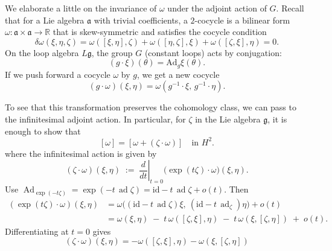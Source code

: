 \documentclass[12pt]{article}
\begin{document}
\begin{remark}
    We elaborate a little on the invariance of $\omega$ under the adjoint action of $G$. Recall that for a Lie algebra $\mathfrak{a}$ with trivial coefficients, a $2$-cocycle is a bilinear form $\omega : \mathfrak{a}\times\mathfrak{a}\to \mathbb{R}$ that is skew-symmetric and satisfies the cocycle condition
    \[
        \delta\omega(\xi,\eta,\zeta) =
        \omega([\xi,\eta],\zeta) + \omega([\eta,\zeta],\xi) + \omega([\zeta,\xi],\eta) = 0.
    \]
    On the loop algebra $L\mathfrak{g}$, the group $G$ (constant loops) acts by conjugation:
    \[
        (g\cdot \xi)(\theta) = \mathrm{Ad}_g \xi(\theta).
    \]
    If we push forward a cocycle $\omega$ by $g$, we get a new cocycle
    \[
        (g\cdot \omega)(\xi,\eta) = \omega(g^{-1}\cdot \xi, \, g^{-1}\cdot \eta).
    \]

    To see that this transformation preserves the cohomology class, we can pass to the infinitesimal adjoint action. In particular, for $\zeta$ in the Lie algebra $\mathfrak{g}$, it is enough to show that
    \[
        [\omega] = [\omega + (\zeta\cdot\omega)] \quad\text{in } H^2.
    \]
    where the infinitesimal action is given by
    \[
        (\zeta\cdot \omega)(\xi,\eta)
        \;:=\; \left.\frac{d}{dt}\right|_{t=0}\big( \exp(t\zeta)\cdot \omega \big)(\xi,\eta).
    \]
    Use $\operatorname{Ad}_{\exp(-t\zeta)} = \exp(-t\,\operatorname{ad}\zeta)
        = \mathrm{id}-t\,\operatorname{ad}\zeta + o(t)$. Then
    \begin{align*}
        (\exp(t\zeta)\cdot \omega)(\xi,\eta)
         & = \omega\Big((\mathrm{id}-t\,\operatorname{ad}\zeta)\xi,\ (\mathrm{id}-t\,\operatorname{ad}_\zeta)\eta\Big) + o(t) \\
         & = \omega(\xi,\eta)\;-\; t\,\omega([\zeta,\xi],\eta)\;-\; t\,\omega(\xi,[\zeta,\eta])\;+\;o(t).
    \end{align*}
    Differentiating at $t=0$ gives
    \[
        (\zeta \cdot \omega)(\xi,\eta)
        = - \omega([\zeta,\xi],\eta) - \omega(\xi,[\zeta,\eta])
    \]


\end{remark}
\end{document}
